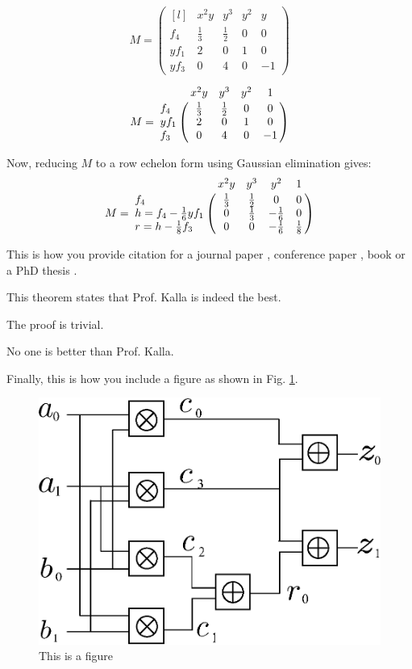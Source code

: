 \[
M = \begin{pmatrix*}[l]
 & x^2y & y^3 & y^2 & y\\
f_4 & \frac{1}{3} & \frac{1}{2} & 0 & 0 \\
yf_1 & 2 &0 & 1 & 0 \\
yf_3 & 0 & 4 & 0 & -1
\end{pmatrix*}
\]

\[
M = \bordermatrix{
~ & x^2y & y^3 & y^2 & 1\cr
f_4 & \frac{1}{3} & \frac{1}{2} & 0 & 0 \cr
yf_1 & 2 &0 & 1 & 0 \cr
f_3 & 0 & 4 & 0 & -1 \cr
}
\]

Now, reducing $M$ to a row echelon form using Gaussian elimination gives:
\[
M = \bordermatrix{
~ & x^2y & y^3 & y^2 & 1\cr
f_4 & \frac{1}{3} & \frac{1}{2} & 0 & 0 \cr 
h = f_4 - \frac{1}{6}yf_1 & 0 &\frac{1}{3}  & -\frac{1}{6} & 0 \cr 
r = h - \frac{1}{8}f_3 & 0 & 0 & -\frac{1}{6} & \frac{1}{8} \cr 
}
\]


This is how you provide citation for a journal paper \cite{ted_tcomp},
conference paper \cite{shekhar:fmcad06}, book \cite{ideals:book} or a
PhD thesis \cite{buchberger_thesis}.  

\begin{Theorem}
This theorem states that Prof. Kalla is indeed the best.
\end{Theorem}

\begin{Proof}
The proof is trivial.
\end{Proof}

\begin{Corollary}
No one is better than Prof. Kalla.
\end{Corollary}

Finally, this is how you include a figure as shown in Fig. \ref{fig:ckt}. 

\begin{figure}[hbt]
\centering
\includegraphics[scale=0.5]{2bitmultiplier.eps}
\caption{This is a figure}
\label{fig:ckt}
\end{figure}